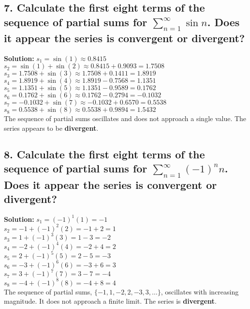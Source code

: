 \documentclass{article}
\begin{document}
\subsection*{7. Calculate the first eight terms of the sequence of partial sums for $\sum_{n=1}^{\infty} \sin n$. Does it appear the series is convergent or divergent?}
\textbf{Solution:}
$s_1 = \sin(1) \approx 0.8415$ \\
$s_2 = \sin(1) + \sin(2) \approx 0.8415 + 0.9093 = 1.7508$ \\
$s_3 = 1.7508 + \sin(3) \approx 1.7508 + 0.1411 = 1.8919$ \\
$s_4 = 1.8919 + \sin(4) \approx 1.8919 - 0.7568 = 1.1351$ \\
$s_5 = 1.1351 + \sin(5) \approx 1.1351 - 0.9589 = 0.1762$ \\
$s_6 = 0.1762 + \sin(6) \approx 0.1762 - 0.2794 = -0.1032$ \\
$s_7 = -0.1032 + \sin(7) \approx -0.1032 + 0.6570 = 0.5538$ \\
$s_8 = 0.5538 + \sin(8) \approx 0.5538 + 0.9894 = 1.5432$ \\
The sequence of partial sums oscillates and does not approach a single value. The series appears to be \textbf{divergent}.

\subsection*{8. Calculate the first eight terms of the sequence of partial sums for $\sum_{n=1}^{\infty} (-1)^n n$. Does it appear the series is convergent or divergent?}
\textbf{Solution:}
$s_1 = (-1)^1(1) = -1$ \\
$s_2 = -1 + (-1)^2(2) = -1 + 2 = 1$ \\
$s_3 = 1 + (-1)^3(3) = 1 - 3 = -2$ \\
$s_4 = -2 + (-1)^4(4) = -2 + 4 = 2$ \\
$s_5 = 2 + (-1)^5(5) = 2 - 5 = -3$ \\
$s_6 = -3 + (-1)^6(6) = -3 + 6 = 3$ \\
$s_7 = 3 + (-1)^7(7) = 3 - 7 = -4$ \\
$s_8 = -4 + (-1)^8(8) = -4 + 8 = 4$ \\
The sequence of partial sums, $\{-1, 1, -2, 2, -3, 3, \dots\}$, oscillates with increasing magnitude. It does not approach a finite limit. The series is \textbf{divergent}.
\end{document}
